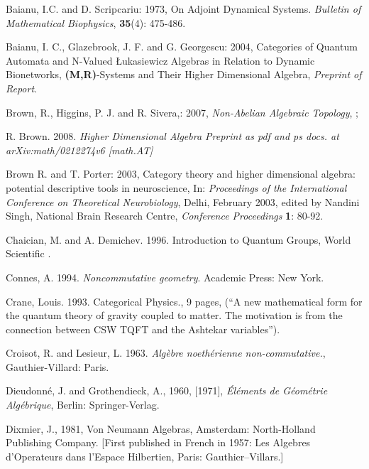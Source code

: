 \documentclass[12pt]{article}
\theoremstyle{plain}
\theoremstyle{definition}
\numberwithin{equation}{section}
\begin{document}
\begin{thebibliography}{99}
Baianu, I.C. and D. Scripcariu: 1973, On Adjoint Dynamical Systems.
\emph{Bulletin of Mathematical Biophysics}, \textbf{35}(4): 475-486.

Baianu, I. C., Glazebrook, J. F. and G. Georgescu: 2004, Categories of Quantum Automata and N-Valued \L ukasiewicz Algebras in Relation to Dynamic Bionetworks, \textbf{(M,R)}-Systems and Their Higher Dimensional Algebra,
\emph{Preprint of Report}.

Brown, R., Higgins, P. J. and R. Sivera,: 2007, \emph{Non-Abelian Algebraic Topology},
;

R. Brown. 2008. {\em Higher Dimensional Algebra Preprint as pdf and ps docs. at arXiv:math/0212274v6 [math.AT]}

Brown R. and T. Porter: 2003, Category theory and higher dimensional algebra: potential descriptive tools in neuroscience, In: {\em Proceedings of the International Conference on Theoretical Neurobiology}, Delhi, February 2003, edited by Nandini Singh, National Brain Research Centre, {\em Conference Proceedings} \textbf{1}: 80-92.


Chaician, M. and A. Demichev. 1996. Introduction to Quantum Groups, World Scientific .

Connes, A. 1994. \emph{Noncommutative geometry}. Academic Press: New York.

Crane, Louis. 1993. Categorical Physics., 9 pages,  
(``A new mathematical form for the quantum theory of gravity coupled to matter. The motivation is from the connection between CSW TQFT and the Ashtekar variables'').

Croisot, R. and Lesieur, L. 1963. \emph{Alg\`ebre noeth\'erienne non-commutative.}, Gauthier-Villard: Paris.

Dieudonn\'e, J. and Grothendieck, A., 1960, [1971], {\em \'El\'ements de G\'eom\'etrie Alg\'ebrique}, Berlin: Springer-Verlag.

Dixmier, J., 1981, Von Neumann Algebras, Amsterdam: North-Holland Publishing Company. [First published in French in 1957: Les Algebres d'Operateurs dans l'Espace Hilbertien, Paris: Gauthier--Villars.]


\end{thebibliography}
\end{document}
